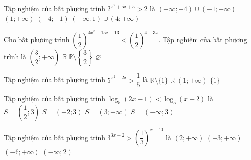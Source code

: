 \begin{ex}%
Tập nghiệm của bất phương trình $2^{x^2+5x+5}>2$ là
\choice
{\True $(-\infty;-4)\cup (-1;+\infty)$}
{$(1;+\infty)$}
{$(-4;-1)$}
{$(-\infty;1)\cup(4;+\infty)$}
\end{ex}
\begin{ex}%
Cho bất phương trình $\left(\dfrac{1}{2}\right)^{4x^2-15x+13}<\left(\dfrac{1}{2}\right)^{4-3x}$. Tập nghiệm của bất phương trình là
\choice
{$\left(\dfrac{3}{2};+\infty\right)$}
{$\mathbb{R}$}
{\True $\mathbb{R}\setminus \left\{\dfrac{3}{2}\right\}$}
{$\varnothing$}
\end{ex}

\begin{ex}%
Tập nghiệm của bất phương trình $5^{x^2-2x}>\dfrac{1}{5}$ là
\choice
{\True $\mathbb{R}\setminus \{ 1\}$}
{$\mathbb{R}$}
{$(1;+\infty)$}
{$\{ 1\}$}
\end{ex}



\begin{ex}%
Tập nghiệm của bất phương trình $\log_{5} \left( 2x-1 \right) < \log_{5} \left( x+2 \right)$ là
\choice
{\True $S = \left( \dfrac{1}{2};3 \right)$}
{$S = \left( -2;3 \right)$}
{$S = \left( 3;+\infty \right)$}
{$S = \left( -\infty;3 \right)$}
\end{ex}

\begin{ex}%
Tập nghiệm của bất phương trình $3^{3x+2}>\left( \dfrac{1}{3}\right)^{x-10}$ là
\choice
{\True $ (2;+\infty) $}
{$(-3;+\infty) $}
{$(-6;+\infty) $}
{$ (-\infty;2) $}
\end{ex}


